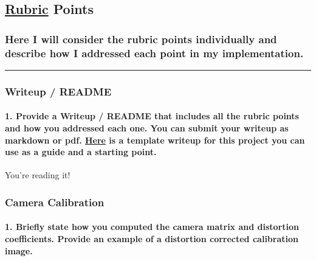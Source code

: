 \documentclass[11pt]{article}
\begin{document}
\subsection{\texorpdfstring{\href{https://review.udacity.com/\#!/rubrics/571/view}{Rubric}
Points}{Rubric Points}}\label{rubric-points}

\subsubsection{Here I will consider the rubric points individually and
describe how I addressed each point in my
implementation.}\label{here-i-will-consider-the-rubric-points-individually-and-describe-how-i-addressed-each-point-in-my-implementation.}

\begin{center}\rule{0.5\linewidth}{\linethickness}\end{center}

\subsubsection{Writeup / README}\label{writeup-readme}

\paragraph{\texorpdfstring{1. Provide a Writeup / README that includes
all the rubric points and how you addressed each one. You can submit
your writeup as markdown or pdf.
\href{https://github.com/udacity/CarND-Advanced-Lane-Lines/blob/master/writeup_template.md}{Here}
is a template writeup for this project you can use as a guide and a
starting
point.}{1. Provide a Writeup / README that includes all the rubric points and how you addressed each one. You can submit your writeup as markdown or pdf. Here is a template writeup for this project you can use as a guide and a starting point.}}\label{provide-a-writeup-readme-that-includes-all-the-rubric-points-and-how-you-addressed-each-one.-you-can-submit-your-writeup-as-markdown-or-pdf.-here-is-a-template-writeup-for-this-project-you-can-use-as-a-guide-and-a-starting-point.}

You're reading it!

\subsubsection{Camera Calibration}\label{camera-calibration}

\paragraph{1. Briefly state how you computed the camera matrix and
distortion coefficients. Provide an example of a distortion corrected
calibration
image.}\label{briefly-state-how-you-computed-the-camera-matrix-and-distortion-coefficients.-provide-an-example-of-a-distortion-corrected-calibration-image.}
\end{document}
